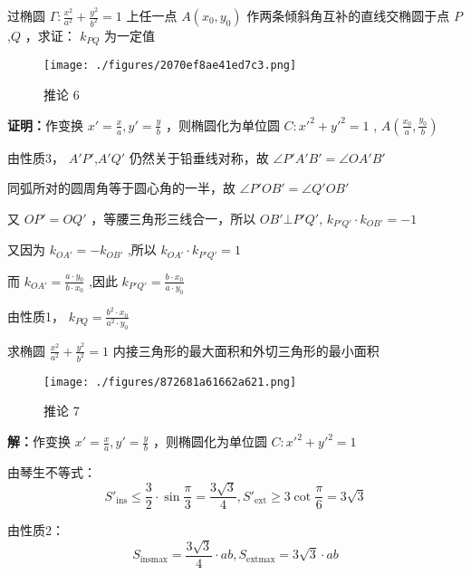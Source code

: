 \begin{corollary}{}
过椭圆 $\displaystyle{\Gamma:\frac{x^2}{a^2}+\frac{y^2}{b^2}=1}$ 上任一点 $\displaystyle{A(x_0,y_0)}$ 作两条倾斜角互补的直线交椭圆于点 $\displaystyle{P}$,$\displaystyle{Q}$ ，求证： $\displaystyle{k_{PQ}}$ 为一定值
\begin{figure}[ht]
\centering
\texttt{[image: ./figures/2070ef8ae41ed7c3.png]}
\caption{推论 6} \label{fig_affine_5}
\end{figure}
\textbf{证明：}作变换 $\displaystyle{x'=\frac{x}{a},y'=\frac{y}{b}}$ ，则椭圆化为单位圆 $\displaystyle{C:x'^2+y'^2=1}$ , $\displaystyle{A\left(\frac{x_0}{a},\frac{y_0}{b}\right)}$ 

由性质3， $\displaystyle{A'P'}$,$\displaystyle{A'Q'}$ 仍然关于铅垂线对称，故 $\displaystyle{\angle P'A'B'=\angle OA'B'}$

同弧所对的圆周角等于圆心角的一半，故 $\displaystyle{\angle P'OB'=\angle Q'OB'}$

又 $\displaystyle{OP'=OQ'}$ ，等腰三角形三线合一，所以 $\displaystyle{OB'\bot P'Q' }$, $\displaystyle{k_{P'Q'}\cdot k_{OB'}=-1}$

又因为 $\displaystyle{k_{OA'}=-k_{OB'}}$ ,所以 $\displaystyle{k_{OA'}\cdot k_{P'Q'}=1}$

而 $\displaystyle{k_{OA'}=\frac{a\cdot y_0}{b\cdot x_0}}$ ,因此 $\displaystyle{k_{P'Q'}=\frac{b\cdot x_0}{a\cdot y_0}}$

由性质1， $\displaystyle{k_{PQ}=\frac{b^2\cdot x_0}{a^2 \cdot y_0}}$ 
\end{corollary}
\begin{corollary}{}
求椭圆 $\displaystyle{\frac{x^2}{a^2}+\frac{y^2}{b^2}=1}$ 内接三角形的最大面积和外切三角形的最小面积
\begin{figure}[ht]
\centering
\texttt{[image: ./figures/872681a61662a621.png]}
\caption{推论 7} \label{fig_affine_6}
\end{figure}
\textbf{解：}作变换 $\displaystyle{x'=\frac{x}{a},y'=\frac{y}{b}}$ ，则椭圆化为单位圆 $\displaystyle{C:x'^2+y'^2=1}$

由琴生不等式：
$$S'_{\text{ins}}\leq \frac{3}{2}\cdot \sin\frac{\pi}{3}=\frac{3\sqrt{3}}{4}, S'_{\text{ext}}\geq 3\cot\frac{\pi}{6}=3\sqrt{3}$$ 

由性质2： 
$$S_{\text{ins}\max}=\frac{3\sqrt{3}}{4}\cdot ab, S_{\text{ext}\max}=3\sqrt{3}\cdot ab$$ 

\end{corollary}
